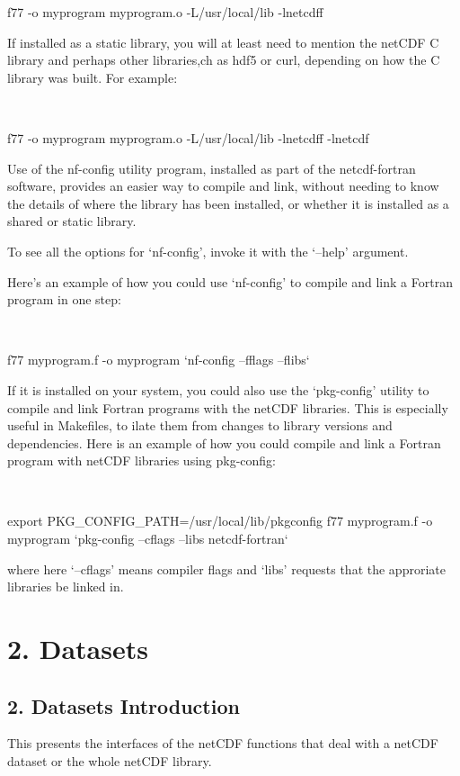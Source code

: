\begin{DoxyVerb}f77 -o myprogram myprogram.o -L/usr/local/lib -lnetcdff
\end{DoxyVerb}


If installed as a static library, you will at least need to mention the net\+C\+DF C library and perhaps other libraries,ch as hdf5 or curl, depending on how the C library was built. For example\+:

 

\begin{DoxyVerb}f77 -o myprogram myprogram.o -L/usr/local/lib -lnetcdff -lnetcdf
\end{DoxyVerb}


Use of the nf-\/config utility program, installed as part of the netcdf-\/fortran software, provides an easier way to compile and link, without needing to know the details of where the library has been installed, or whether it is installed as a shared or static library.

To see all the options for ‘nf-\/config’, invoke it with the ‘–help’ argument.

Here’s an example of how you could use ‘nf-\/config’ to compile and link a Fortran program in one step\+:

 

\begin{DoxyVerb}f77 myprogram.f -o myprogram `nf-config --fflags --flibs`
\end{DoxyVerb}


If it is installed on your system, you could also use the ‘pkg-\/config’ utility to compile and link Fortran programs with the net\+C\+DF libraries. This is especially useful in Makefiles, to ilate them from changes to library versions and dependencies. Here is an example of how you could compile and link a Fortran program with net\+C\+DF libraries using pkg-\/config\+:

 

\begin{DoxyVerb}export PKG_CONFIG_PATH=/usr/local/lib/pkgconfig
f77 myprogram.f -o myprogram `pkg-config --cflags --libs netcdf-fortran`
\end{DoxyVerb}


where here ‘–cflags’ means compiler flags and ‘libs’ requests that the approriate libraries be linked in.\hypertarget{nc_f77_interface_guide_f77_Datasets}{}\section{2. Datasets  }\label{nc_f77_interface_guide_f77_Datasets}
\hypertarget{nc_f77_interface_guide_f77_Datasets_Introduction}{}\subsection{2. Datasets Introduction }\label{nc_f77_interface_guide_f77_Datasets_Introduction}
This presents the interfaces of the net\+C\+DF functions that deal with a net\+C\+DF dataset or the whole net\+C\+DF library.

